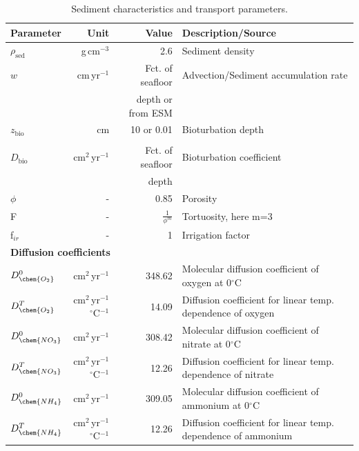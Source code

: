 \documentclass[gmd, manuscript]{copernicus}
\begin{document}
\begin{table}[hbtp]
\caption{Sediment characteristics and transport parameters.}
\centering
\begin{tabular}{l r r l}
\hline\hline
Parameter & Unit  & Value & Description/Source\\
\hline
$\rho_{\mathrm{sed}}$ & g\,cm$^{-3}$ & 2.6 & Sediment density \\
$w$ & cm\,yr$^{-1}$ &  Fct. of seafloor & Advection/Sediment accumulation rate \\
&& depth or from ESM & \citep{middelburg_empirical_1997}\\
$z_{\mathrm{bio}}$& cm & 10 or 0.01 & Bioturbation depth\\
&&&\citep{boudreau_mean_1998, teal_global_2010}\\
$D_{\mathrm{bio}}$& cm$^2$\,yr$^{-1}$ & Fct. of seafloor & Bioturbation coefficient\\
&& depth &\citep{middelburg_empirical_1997}\\
$\phi$ & - & 0.85 & Porosity\\
F & - &  $\frac{1}{\phi^m}$ & Tortuosity, here m=3\\
f$_{ir}$ & - & 1 & Irrigation factor\\
\multicolumn{4}{l}{\textbf{Diffusion coefficients} \citep{Li_diffusion_1974, schulz_quantification_2006, gypens_simple_2008}}\\
$D_{\chem{O_2}}^0$ & cm$^2$\,yr$^{-1}$ & 348.62 &Molecular diffusion coefficient of oxygen at 0$^\circ$C\\
$D_{\chem{O_2}}^T$ & cm$^2$\,yr$^{-1}$\,${}^{\circ}$C$^{-1}$ & 14.09 &Diffusion coefficient for linear temp. dependence of oxygen\\ %
$D_{\chem{NO_3}}^0$ & cm$^2$\,yr$^{-1}$ & 308.42 &Molecular diffusion coefficient of nitrate at 0$^\circ$C\\
$D_{\chem{NO_3}}^T$ & cm$^2$\,yr$^{-1}$\,${}^{\circ}$C$^{-1}$ & 12.26 &Diffusion coefficient for linear temp. dependence of nitrate\\ %
$D_{\chem{NH_4}}^0$ & cm$^2$\,yr$^{-1}$ & 309.05 &Molecular diffusion coefficient of ammonium at 0$^\circ$C\\
$D_{\chem{NH_4}}^T$ & cm$^2$\,yr$^{-1}$\,${}^{\circ}$C$^{-1}$ & 12.26 &Diffusion coefficient for linear temp. dependence of ammonium\\ %

\end{tabular}
\end{table}
\end{document}
